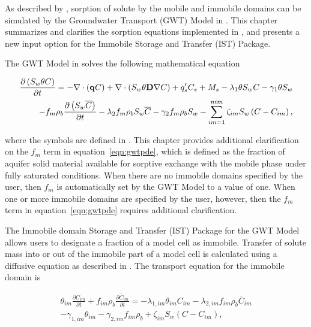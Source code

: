 
As described by \cite{modflow6gwt}, sorption of solute by the mobile and immobile domains can be simulated by the Groundwater Transport (GWT) Model in \mf.  This chapter summarizes and clarifies the sorption equations implemented in \mf, and presents a new input option for the Immobile Storage and Transfer (IST) Package.

The GWT Model in \mf solves the following mathematical equation

\begin{equation}
\label{eqn:gwtpde}
\begin{aligned}
\frac {\partial \left ( S_w \theta C \right )}{\partial t} = 
- \nabla \cdot \left ( \mathbf{q} C  \right ) 
+ \nabla \cdot \left ( S_w \theta \mathbf{D} \nabla C \right ) 
+ q'_s C_s + M_s  
- \lambda_1 \theta S_w C - \gamma_1 \theta S_w \\
- f_m \rho_b \frac {\partial \left ( S_w \overline{C} \right ) }{\partial t} 
- \lambda_2 f_m \rho_b S_w \overline{C} - \gamma_2 f_m \rho_b S_w 
- \sum \limits_{im=1}^{nim}  \zeta_{im} S_w \left ( C - C_{im} \right ),
\end{aligned}
\end{equation}

\noindent where the symbols are defined in \cite{modflow6gwt}.  This chapter provides additional clarification on the $f_m$ term in equation~\ref{eqn:gwtpde}, which is defined as the fraction of aquifer solid material available for sorptive exchange with the mobile phase under fully saturated conditions.  When there are no immobile domains specified by the user, then $f_m$ is automatically set by the GWT Model to a value of one.  When one or more immobile domains are specified by the user, however, then the $f_m$ term in equation~\ref{eqn:gwtpde} requires additional clarification.

The Immobile domain Storage and Transfer (IST) Package for the GWT Model allows users to designate a fraction of a model cell as immobile.  Transfer of solute mass into or out of the immobile part of a model cell is calculated using a diffusive equation as described in \cite{modflow6gwt}.  The transport equation for the immobile domain is

\begin{equation}
\label{eqn:gwtistpde}
\begin{split}
\theta_{im} \frac{\partial C_{im} }{\partial t} + f_{im} \rho_b \frac{\partial \overline{C}_{im}}{\partial t} = 
- \lambda_{1,im} \theta_{im} C_{im} - \lambda_{2,im}  f_{im} \rho_b \overline{C}_{im} \\
- \gamma_{1,im} \theta_{im} - \gamma_{2,im} f_{im}  \rho_b 
+ \zeta_{im} S_w \left ( C - C_{im} \right ),
\end{split}
\end{equation}

